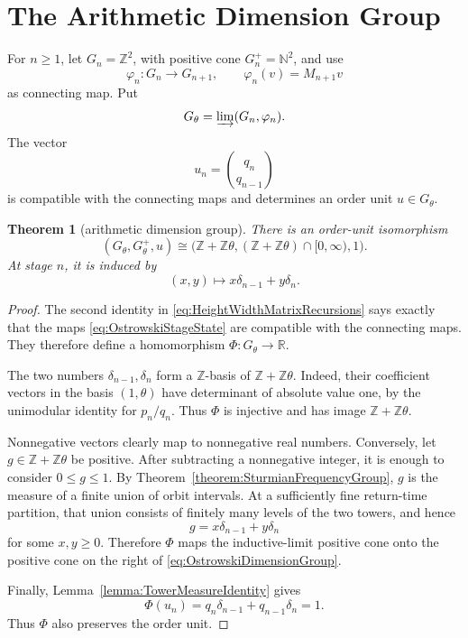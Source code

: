 \documentclass{book}
\newtheorem{theorem}[definition]{Theorem}
\begin{document}
\section{The Arithmetic Dimension Group}

For \(n\geq1\), let \(G_n=\mathbb Z^2\), with positive cone
\(G_n^+=\mathbb N^2\), and use
\[
  \varphi_n\colon G_n\longrightarrow G_{n+1},
  \qquad \varphi_n(v)=M_{n+1}v
\]
as connecting map.  Put
\[
  G_\theta=\varinjlim(G_n,\varphi_n).
\]
The vector
\[
  u_n=\binom{q_n}{q_{n-1}}
\]
is compatible with the connecting maps and determines an order unit
\(u\in G_\theta\).

\begin{theorem}[arithmetic dimension group]
  \label{theorem:OstrowskiDimensionGroup}
  There is an order-unit isomorphism
  \begin{equation}\label{eq:OstrowskiDimensionGroup}
    (G_\theta,G_\theta^+,u)
    \cong
    \bigl(\mathbb Z+\mathbb Z\theta,
      (\mathbb Z+\mathbb Z\theta)\cap[0,\infty),1\bigr).
  \end{equation}
  At stage \(n\), it is induced by
  \begin{equation}\label{eq:OstrowskiStageState}
    (x,y)\longmapsto x\delta_{n-1}+y\delta_n.
  \end{equation}
\end{theorem}
\begin{proof}
  The second identity in \eqref{eq:HeightWidthMatrixRecursions} says exactly
  that the maps \eqref{eq:OstrowskiStageState} are compatible with the
  connecting maps.  They therefore define a homomorphism
  \(\Phi\colon G_\theta\to\mathbb R\).

  The two numbers \(\delta_{n-1},\delta_n\) form a \(\mathbb Z\)-basis of
  \(\mathbb Z+\mathbb Z\theta\).  Indeed, their coefficient vectors in the
  basis \((1,\theta)\) have determinant of absolute value one, by the
  unimodular identity for \(p_n/q_n\).  Thus \(\Phi\) is injective and has
  image \(\mathbb Z+\mathbb Z\theta\).

  Nonnegative vectors clearly map to nonnegative real numbers.  Conversely,
  let \(g\in\mathbb Z+\mathbb Z\theta\) be positive.  After subtracting a
  nonnegative integer, it is enough to consider \(0\leq g\leq1\).  By
  Theorem~\ref{theorem:SturmianFrequencyGroup}, \(g\) is the measure of a
  finite union of orbit intervals.  At a sufficiently fine return-time
  partition, that union consists of finitely many levels of the two towers,
  and hence
  \[
    g=x\delta_{n-1}+y\delta_n
  \]
  for some \(x,y\geq0\).  Therefore \(\Phi\) maps the inductive-limit
  positive cone onto the positive cone on the right of
  \eqref{eq:OstrowskiDimensionGroup}.

  Finally, Lemma~\ref{lemma:TowerMeasureIdentity} gives
  \[
    \Phi(u_n)=q_n\delta_{n-1}+q_{n-1}\delta_n=1.
  \]
  Thus \(\Phi\) also preserves the order unit.
\end{proof}
\end{document}
